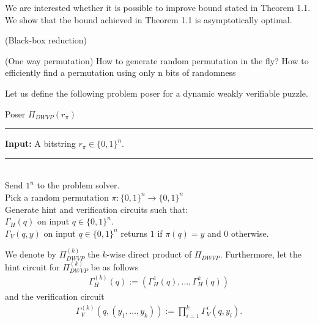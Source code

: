 We are interested whether it is possible to improve bound stated in Theorem 1.1.
We show that the bound achieved in Theorem 1.1 is asymptotically optimal.

\begin{definition}(Black-box reduction)
\end{definition}

\begin{definition}(One way permutation)
  How to generate random permutation in the fly?
  How to efficiently find a permutation using only n bits of randomness
\end{definition}

Let us define the following problem poser for a dynamic weakly verifiable puzzle.

\begin{codeblock}
  Poser $\Pi_{DWVP}(r_{\pi})$
  \medskip\hrule\medskip
  \textbf{Input:} A bitstring $r_{\pi} \in \{0,1\}^{n}$.
  \medskip\hrule\medskip
  \IndI \\
  Send $1^n$ to the problem solver.\\
  Pick a random permutation $\pi: \{0,1\}^{n} \rightarrow \{0,1\}^{n}$ \\
  Generate hint and verification circuits such that: \\
  $\Gamma_H(q)$ on input $q \in \{0,1\}^{n}$.\\
  $\Gamma_V(q,y)$ on input $q \in \{0,1\}^{n}$ returns $1$ if $\pi(q) = y$ and $0$ otherwise.
\end{codeblock}

We denote by $\Pi_{DWVP}^{(k)}$ the $k$-wise direct product of $\Pi_{DWVP}$. Furthermore, let the hint circuit for $\Pi_{DWVP}^{(k)}$ be as follows
\begin{align*}
  \Gamma_H^{(k)}(q) := (\Gamma_H^{1}(q), \dotsc, \Gamma_H^{k}(q))
\end{align*}
and the verification circuit
\begin{align*}
  \Gamma_V^{(k)}(q, (y_1, \dotsc, y_k)) := \prod_{i=1}^{k} \Gamma_V^{i}(q, y_i).
\end{align*}

